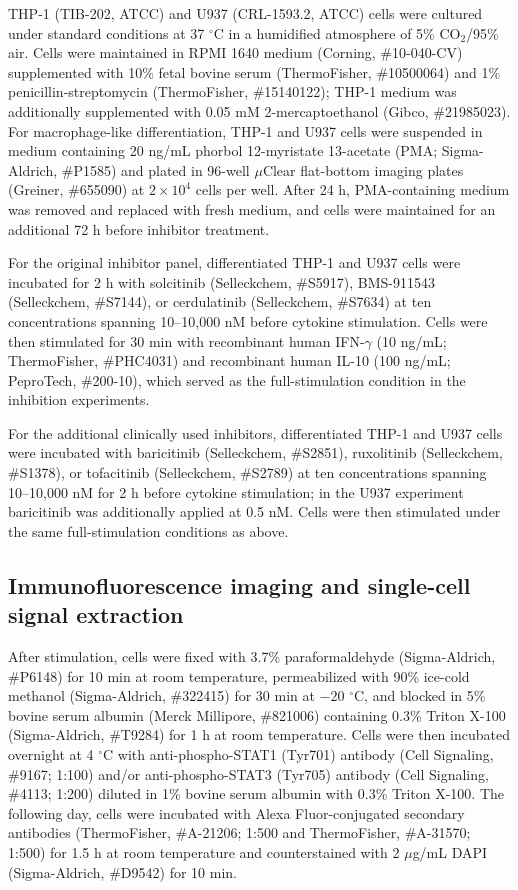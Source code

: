 \documentclass[11pt]{article}
\newcommand{\ifng}{IFN-$\gamma$}
\begin{document}
THP-1 (TIB-202, ATCC) and U937 (CRL-1593.2, ATCC) cells were cultured under standard conditions at 37 $^\circ$C in a humidified atmosphere of 5\% CO$_2$/95\% air. Cells were maintained in RPMI 1640 medium (Corning, \#10-040-CV) supplemented with 10\% fetal bovine serum (ThermoFisher, \#10500064) and 1\% penicillin-streptomycin (ThermoFisher, \#15140122); THP-1 medium was additionally supplemented with 0.05 mM 2-mercaptoethanol (Gibco, \#21985023). For macrophage-like differentiation, THP-1 and U937 cells were suspended in medium containing 20 ng/mL phorbol 12-myristate 13-acetate (PMA; Sigma-Aldrich, \#P1585) and plated in 96-well $\mu$Clear flat-bottom imaging plates (Greiner, \#655090) at $2 \times 10^4$ cells per well. After 24 h, PMA-containing medium was removed and replaced with fresh medium, and cells were maintained for an additional 72 h before inhibitor treatment.

For the original inhibitor panel, differentiated THP-1 and U937 cells were incubated for 2 h with solcitinib (Selleckchem, \#S5917), BMS-911543 (Selleckchem, \#S7144), or cerdulatinib (Selleckchem, \#S7634) at ten concentrations spanning 10--10,000 nM before cytokine stimulation. Cells were then stimulated for 30 min with recombinant human \ifng{} (10 ng/mL; ThermoFisher, \#PHC4031) and recombinant human IL-10 (100 ng/mL; PeproTech, \#200-10), which served as the full-stimulation condition in the inhibition experiments.

For the additional clinically used inhibitors, differentiated THP-1 and U937 cells were incubated with baricitinib (Selleckchem, \#S2851), ruxolitinib (Selleckchem, \#S1378), or tofacitinib (Selleckchem, \#S2789) at ten concentrations spanning 10--10,000 nM for 2 h before cytokine stimulation; in the U937 experiment baricitinib was additionally applied at 0.5 nM. Cells were then stimulated under the same full-stimulation conditions as above.

\subsection*{Immunofluorescence imaging and single-cell signal extraction}

After stimulation, cells were fixed with 3.7\% paraformaldehyde (Sigma-Aldrich, \#P6148) for 10 min at room temperature, permeabilized with 90\% ice-cold methanol (Sigma-Aldrich, \#322415) for 30 min at $-20$ $^\circ$C, and blocked in 5\% bovine serum albumin (Merck Millipore, \#821006) containing 0.3\% Triton X-100 (Sigma-Aldrich, \#T9284) for 1 h at room temperature. Cells were then incubated overnight at 4 $^\circ$C with anti-phospho-STAT1 (Tyr701) antibody (Cell Signaling, \#9167; 1:100) and/or anti-phospho-STAT3 (Tyr705) antibody (Cell Signaling, \#4113; 1:200) diluted in 1\% bovine serum albumin with 0.3\% Triton X-100. The following day, cells were incubated with Alexa Fluor-conjugated secondary antibodies (ThermoFisher, \#A-21206; 1:500 and ThermoFisher, \#A-31570; 1:500) for 1.5 h at room temperature and counterstained with 2 $\mu$g/mL DAPI (Sigma-Aldrich, \#D9542) for 10 min.
\end{document}
